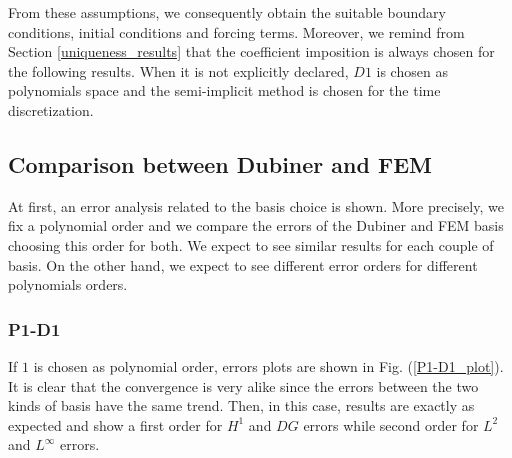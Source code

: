 \documentclass[a4paper,11pt]{article}
\begin{document}
\noindent From these assumptions, we consequently obtain the suitable boundary conditions, initial conditions and forcing terms. Moreover, we remind from Section \ref{uniqueness_results} that the coefficient imposition is always chosen for the following results. When it is not explicitly declared, $D1$ is chosen as polynomials space and the semi-implicit method is chosen for the time discretization.

\subsection{Comparison between Dubiner and FEM}
At first, an error analysis related to the basis choice is shown. More precisely, we fix a polynomial order and we compare the errors of the Dubiner and FEM basis choosing this order for both. We expect to see similar results for each couple of basis. On the other hand, we expect to see different error orders for different polynomials orders.
\subsubsection{P1-D1}
If $1$ is chosen as polynomial order, errors plots are shown in Fig. (\ref{P1-D1_plot}). 
\noindent It is clear that the convergence is very alike since the errors between the two kinds of basis have the same trend. Then, in this case, results are exactly as expected and show a first order for $H^1$ and $DG$ errors while second order for $L^2$ and $L^\infty$ errors.
\end{document}
